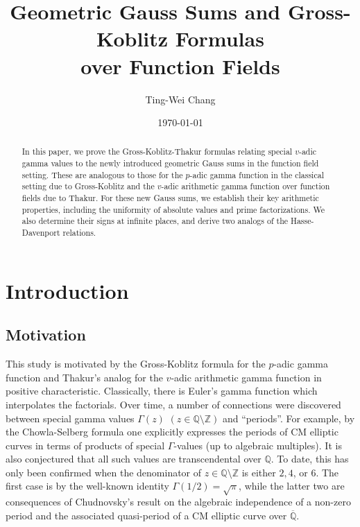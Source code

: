 \documentclass[11pt]{amsart}
\title[Geometric Gauss Sums and Gross-Koblitz Formulas over Function Fields]{Geometric Gauss Sums and Gross-Koblitz Formulas \\ over Function Fields}
\author{Ting-Wei Chang}
\date{\today}
\makeatletter
\theoremstyle{plain}
\theoremstyle{definition}
\theoremstyle{remark}
\numberwithin{equation}{section}
\newcommand{\ZZ}{\mathbb{Z}}
\newcommand{\QQ}{\mathbb{Q}}
\newcommand{\ovl}{\overline}
\newcommand{\myToC}{{
		\renewcommand{\contentsname}{Contents}
		\@starttoc{toc}{\contentsname}
}}
\makeatother
\begin{document}
	
	\begin{abstract}
		In this paper, we prove the Gross-Koblitz-Thakur formulas relating special $v$-adic gamma values to the newly introduced geometric Gauss sums in the function field setting.
		These are analogous to those for the $p$-adic gamma function in the classical setting due to Gross-Koblitz and the $v$-adic arithmetic gamma function over function fields due to Thakur.
		For these new Gauss sums, we establish their key arithmetic properties, including the uniformity of absolute values and prime factorizations.
		We also determine their signs at infinite places, and derive two analogs of the Hasse-Davenport relations.
	\end{abstract}
	
	\maketitle
	
	\setcounter{tocdepth}{2}
	\myToC
	
	\section{Introduction}
	
	\subsection{Motivation}
	
	This study is motivated by the Gross-Koblitz formula for the $p$-adic gamma function and Thakur's analog for the $v$-adic arithmetic gamma function in positive characteristic.
	Classically, there is Euler's gamma function which interpolates the factorials.
	Over time, a number of connections were discovered between special gamma values $\Gamma(z)$ $(z \in \QQ \setminus \ZZ)$ and “periods”.
	For example, by the Chowla-Selberg formula \cite{sc1967epstein} one explicitly expresses the periods of CM elliptic curves in terms of products of special $\Gamma$-values (up to algebraic multiples).
	It is also conjectured that all such values are transcendental over $\QQ$.
	To date, this has only been confirmed when the denominator of $z \in \QQ \setminus \ZZ$ is either $2,4$, or $6$.
	The first case is by the well-known identity $\Gamma(1/2) = \sqrt{\pi}$, while the latter two are consequences of Chudnovsky's result \cite{chudnovsky1984contributions} on the algebraic independence of a non-zero period and the associated quasi-period of a CM elliptic curve over $\ovl{\QQ}$.
	
\end{document}
